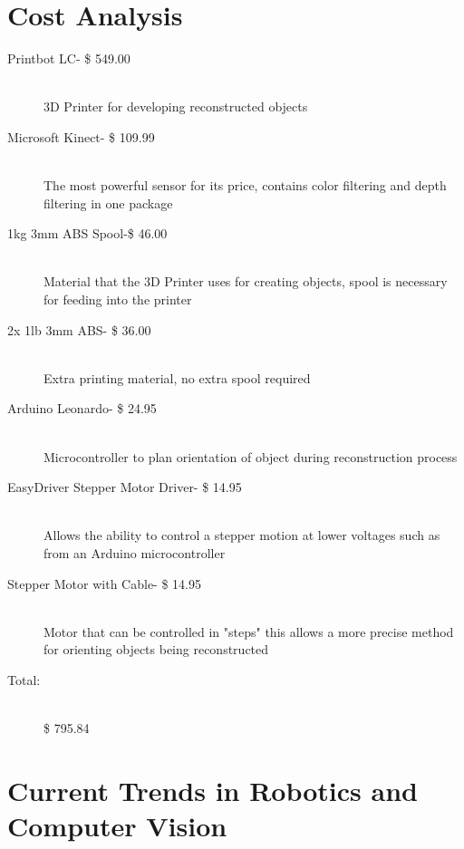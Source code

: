 \documentclass[12pt,twocolumn]{article}
\begin{document}
\section{Cost Analysis}
  \begin{description}
  \item[Printbot LC- \$ 549.00] \hfill \\
  3D Printer for developing reconstructed objects
  \item[Microsoft Kinect- \$ 109.99] \hfill \\
  The most powerful sensor for its price, contains color filtering and depth filtering in one package
  \item[1kg 3mm ABS Spool-\$ 46.00] \hfill \\
  Material that the 3D Printer uses for creating objects, spool is necessary for feeding into the printer
  \item[2x 1lb 3mm ABS- \$ 36.00] \hfill \\
  Extra printing material, no extra spool required
  \item[Arduino Leonardo-  \$ 24.95] \hfill \\
  Microcontroller to plan orientation of object during reconstruction process
  \item[EasyDriver Stepper Motor Driver- \$ 14.95] \hfill \\
  Allows the ability to control a stepper motion at lower voltages such as from an Arduino microcontroller
  \item[Stepper Motor with Cable- \$ 14.95] \hfill \\
  Motor that can be controlled in "steps" this allows a more precise method for orienting objects being reconstructed
  \item[Total:] \hfill \\
  \$ 795.84
  \end{description}

\section{Current Trends in Robotics and Computer Vision}
\end{document}
